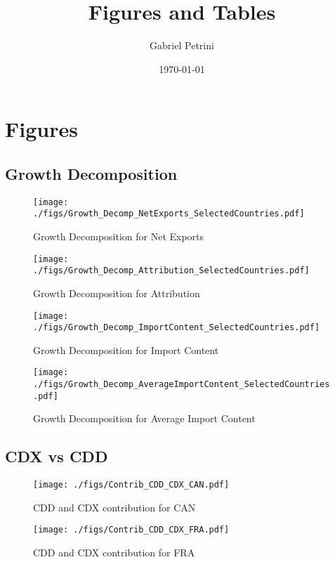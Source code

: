 \documentclass[11pt]{article}
\author{Gabriel Petrini}
\date{\today}
\title{Figures and Tables}
\begin{document}
\maketitle
\tableofcontents

\section{Figures}
\label{sec:org84a1039}

\subsection{Growth Decomposition}
\label{sec:orgb28ccca}

\begin{figure}[t]
\centering
\texttt{[image: ./figs/Growth\_Decomp\_NetExports\_SelectedCountries.pdf]}
\caption{Growth Decomposition for Net Exports}
\end{figure}

\begin{figure}[t]
\centering
\texttt{[image: ./figs/Growth\_Decomp\_Attribution\_SelectedCountries.pdf]}
\caption{Growth Decomposition for Attribution}
\end{figure}

\begin{figure}[t]
\centering
\texttt{[image: ./figs/Growth\_Decomp\_ImportContent\_SelectedCountries.pdf]}
\caption{Growth Decomposition for Import Content}
\end{figure}

\begin{figure}[t]
\centering
\texttt{[image: ./figs/Growth\_Decomp\_AverageImportContent\_SelectedCountries.pdf]}
\caption{Growth Decomposition for Average Import Content}
\end{figure}
\subsection{CDX vs CDD}
\label{sec:org9903dfe}


\begin{figure}[t]
\centering
\texttt{[image: ./figs/Contrib\_CDD\_CDX\_CAN.pdf]}
\caption{CDD and CDX contribution for CAN}
\end{figure}

\begin{figure}[t]
\centering
\texttt{[image: ./figs/Contrib\_CDD\_CDX\_FRA.pdf]}
\caption{CDD and CDX contribution for FRA}
\end{figure}
\end{document}
